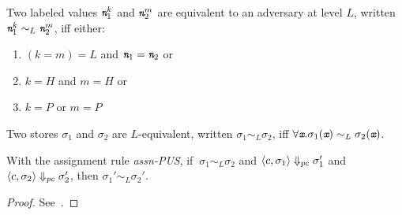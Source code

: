 \begin{mydef}
\label{def:pus}
  Two labeled values $\emph{\texttt{n}}_1^k$ and $\emph{\texttt{n}}_2^m$ are
  equivalent to an adversary at level $L$,
  written $\emph{\texttt{n}}_1^k \sim_L \emph{\texttt{n}}_2^m$, iff either:
  \begin{enumerate}
  \item $(k = m) = L$ and $\emph{\texttt{n}}_1 = \emph{\texttt{n}}_2$ or
  \item $k = H$ and $m = H$ or
  \item $k = P$ or $m = P$
  \end{enumerate}
\end{mydef}

\begin{mydef}
  Two stores $\sigma_1$ and $\sigma_2$ are $L$-equivalent,
  written $\sigma_1 \sim_L \sigma_2$, iff 
  $\forall \emph{\texttt{x}}. \sigma_1(\emph{\texttt{x}}) \sim_L \sigma_2(\emph{\texttt{x}})$.
\end{mydef}

\begin{myThm}
  With the assignment rule \emph{assn-PUS}, if
  $~\sigma_1 \sim_L \sigma_2$ and $\langle c, \sigma_1 \rangle
  \Downarrow_{\mathit{pc}} \sigma_1' $ and $\langle c, \sigma_2
  \rangle\Downarrow_{\mathit{pc}} \sigma_2' $, then $\sigma_1' \sim_L
  \sigma_2'$.
\end{myThm}
\begin{proof} See~\cite{plas10}.
\end{proof}


